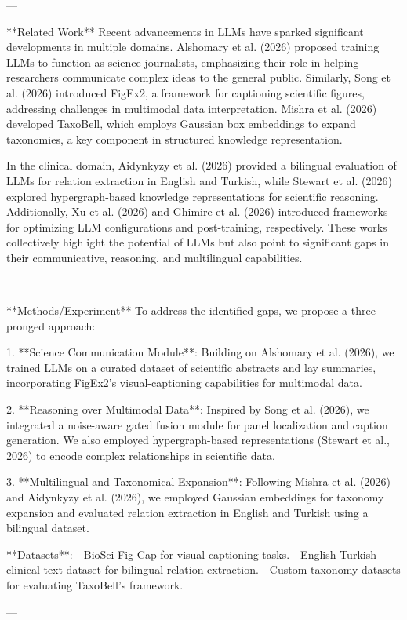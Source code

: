 ---

**Related Work**  
Recent advancements in LLMs have sparked significant developments in multiple domains. Alshomary et al. (2026) proposed training LLMs to function as science journalists, emphasizing their role in helping researchers communicate complex ideas to the general public. Similarly, Song et al. (2026) introduced FigEx2, a framework for captioning scientific figures, addressing challenges in multimodal data interpretation. Mishra et al. (2026) developed TaxoBell, which employs Gaussian box embeddings to expand taxonomies, a key component in structured knowledge representation.

In the clinical domain, Aidynkyzy et al. (2026) provided a bilingual evaluation of LLMs for relation extraction in English and Turkish, while Stewart et al. (2026) explored hypergraph-based knowledge representations for scientific reasoning. Additionally, Xu et al. (2026) and Ghimire et al. (2026) introduced frameworks for optimizing LLM configurations and post-training, respectively. These works collectively highlight the potential of LLMs but also point to significant gaps in their communicative, reasoning, and multilingual capabilities.

---

**Methods/Experiment**  
To address the identified gaps, we propose a three-pronged approach:

1. **Science Communication Module**:  
   Building on Alshomary et al. (2026), we trained LLMs on a curated dataset of scientific abstracts and lay summaries, incorporating FigEx2's visual-captioning capabilities for multimodal data.

2. **Reasoning over Multimodal Data**:  
   Inspired by Song et al. (2026), we integrated a noise-aware gated fusion module for panel localization and caption generation. We also employed hypergraph-based representations (Stewart et al., 2026) to encode complex relationships in scientific data.

3. **Multilingual and Taxonomical Expansion**:  
   Following Mishra et al. (2026) and Aidynkyzy et al. (2026), we employed Gaussian embeddings for taxonomy expansion and evaluated relation extraction in English and Turkish using a bilingual dataset.

**Datasets**:  
- BioSci-Fig-Cap for visual captioning tasks.  
- English-Turkish clinical text dataset for bilingual relation extraction.  
- Custom taxonomy datasets for evaluating TaxoBell's framework.

---

